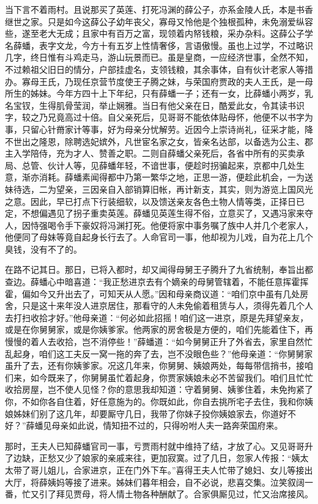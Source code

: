 \documentclass[12pt,oneside]{book}
\begin{document}
当下言不着雨村。且说那买了英莲、打死冯渊的薛公子，亦系金陵人氏，本是书香继世之家。只是如今这薛公子幼年丧父，寡母又怜他是个独根孤种，未免溺爱纵容些，遂至老大无成；且家中有百万之富，现领着内帑钱粮，采办杂料。这薛公子学名薛蟠，表字文龙，今方十有五岁上性情奢侈，言语傲慢。虽也上过学，不过略识几字，终日惟有斗鸡走马，游山玩景而已。虽是皇商，一应经济世事，全然不知，不过赖祖父旧日的情分，户部挂虚名，支领钱粮，其余事体，自有伙计老家人等措办。寡母王氏，乃现任京营节度使王子腾之妹，与荣国府贾政的夫人王氏，是一母所生的姊妹。今年方四十上下年纪，只有薛蟠一子；还有一女，比薛蟠小两岁，乳名宝钗，生得肌骨莹润，举止娴雅。当日有他父亲在日，酷爱此女，令其读书识字，较之乃兄竟高过十倍。自父亲死后，见哥哥不能依体贴母怀，他便不以书字为事，只留心针黹家计等事，好为母亲分忧解劳。近因今上崇诗尚礼，征采才能，降不世出之隆恩，除聘选妃嫔外，凡世宦名家之女，皆亲名达部，以备选为公主、郡主入学陪侍，充为才人、赞善之职。二则自薛蟠父亲死后，各省中所有的买卖承局、总管、伙计人等，见薛蟠年轻，不谙世事，便趁时拐骗起来，京都中几处生意，渐亦消耗。薛蟠素闻得都中乃第一繁华之地，正思一游，便趁此机会，一为送妹待选，二为望亲，三因亲自入部销算旧帐，再计新支，其实，则为游览上国风光之意。因此，早已打点下行装细软，以及馈送亲友各色土物人情等类，正择日已定，不想偏遇见了拐子重卖英莲。薛蟠见英莲生得不俗，立意买了，又遇冯家来夺人，因恃强喝令手下豪奴将冯渊打死。他便将家中事务嘱了族中人并几个老家人，他便同了母妹等竟自起身长行去了。人命官司一事，他却视为儿戏，自为花上几个臭钱，没有不了的。

在路不记其日。那日，已将入都时，却又闻得母舅王子腾升了九省统制，奉旨出都查边。薛蟠心中暗喜道：“我正愁进京去有个嫡亲的母舅管辖着，不能任意挥霍挥霍，偏如今又升出去了，可知天从人愿。”因和母亲商议道：“咱们京中虽有几处房舍，只是这十来年没人进京居住，那看守的人未免偷着租赁与人，须得先着几个人去打扫收拾才好。”他母亲道：“何必如此招摇！咱们这一进京，原是先拜望亲友，或是在你舅舅家，或是你姨爹家。他两家的房舍极是方便的，咱们先能着住下，再慢慢的着人去收拾，岂不消停些！”薛蟠道：“如今舅舅正升了外省去，家里自然忙乱起身，咱们这工夫反一窝一拖的奔了去，岂不没眼色些？”他母亲道：“你舅舅家虽升了去，还有你姨爹家。况这几年来，你舅舅、姨娘两处，每每带信捎书，接咱们来，如今既来了，你舅舅虽忙着起身，你贾家姨娘未必不苦留我们。咱们且忙忙收拾房屋，岂不使人见怪？你的意思我却知道：守着舅舅、姨爹住着，未免拘紧了你，不如你各自住着，好任意施为的。你既如此，你自去挑所宅子去住，我和你姨娘姊妹们别了这几年，却要厮守几日，我带了你妹子投你姨娘家去，你道好不好？”薛蟠见母亲如此说，情知扭不过的，只得吩咐人夫一路奔荣国府来。

那时，王夫人已知薛蟠官司一事，亏贾雨村就中维持了结，才放了心。又见哥哥升了边缺，正愁又少了娘家的亲戚来往，更加寂寞。过了几日，忽家人传报：“姨太太带了哥儿姐儿，合家进京，正在门外下车。”喜得王夫人忙带了媳妇、女儿等接出大厅，将薛姨妈等接了进来。姊妹们暮年相会，自不必说，悲喜交集。泣笑叙阔一番，忙又引了拜见贾母，将人情土物各种酬献了。合家俱厮见过，忙又治席接风。
\end{document}
